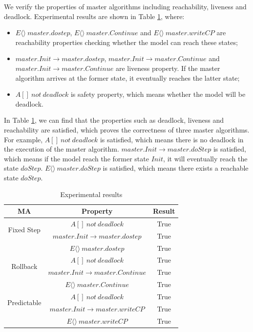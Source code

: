  
We verify the properties of master algorithms including reachability, liveness and deadlock. Experimental results are shown in Table \ref{ta_r}, where:

\begin{itemize}
\item
$E \langle\rangle ~master.dostep$, $E\langle\rangle~master.Continue$ and $E\langle\rangle~master.writeCP$ are reachability properties checking whether the model can reach these states;
\item
$master.Init \rightarrow master.dostep$, $master.Init \rightarrow master.Continue$ and $master.Init \rightarrow master.Continue$ are liveness property. If the master algorithm arrives at the former state, it eventually reaches the latter state;
\item
$A[]~not~deadlock$ is safety property, which means whether the model will be deadlock.
\end{itemize}

In Table \ref{ta_r}, we can find that the properties such as deadlock, liveness and reachability are satisfied,  which proves the correctness of three master algorithms. For example, $A[]~not~deadlock$ is satisfied, which means there is no deadlock in the execution of the master algorithm. $master.Init \rightarrow master.doStep$ is satisfied, which means if the model reach the former state $Init$, it will eventually reach the state $doStep$. $E\langle\rangle~master.doStep$ is satisfied, which means there exists a reachable state $doStep$. 

\begin{table}
\caption{Experimental results}
\centering
\begin{tabular}{c c c}
        \hline
        MA & Property & Result\\
        \hline
        \multirow{2}{2.0cm}{Fixed Step}
                & $A[]~not~deadlock$ & True\\
                & $master.Init \rightarrow master.dostep$ & True\\
                & $E\langle\rangle~master.dostep$ & True\\

        \hline
        \multirow{2}{2.0cm}{Rollback}
                & $A[]~not~deadlock$ & True\\
                & $master.Init \rightarrow master.Continue$ & True\\
                & $E\langle\rangle~master.Continue$ & True\\

        \hline
        \multirow{2}{2.0cm}{Predictable}
                & $A[]~not~deadlock$ & True\\
                & $master.Init \rightarrow  master.writeCP$ & True\\
                & $E\langle\rangle~master.writeCP$ & True\\
        \hline
\end{tabular}
\label{ta_r}
\end{table}

